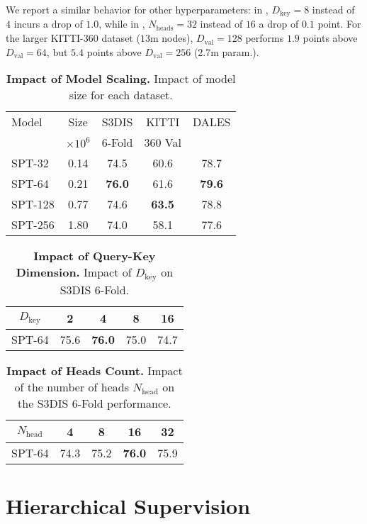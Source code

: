 We report a similar behavior for other hyperparameters: in , $D_\text{key}=8$ instead of $4$ incurs a drop of $1.0$, while in , $N_\text{heads}=32$ instead of $16$ a drop of $0.1$ point. For the larger KITTI-360 dataset ($13$m nodes), $D_\text{val}={128}$ performs $1.9$ points above $D_\text{val}=64$, but $5.4$ points above $D_\text{val}=256$ (2.7m param.).

\begin{table}[H]
\caption{\textbf{Impact of Model Scaling.} Impact of model size for each dataset.}
\label{tab:scalingablation}
\centering
\small{
\begin{tabular}{@{}lcccc@{}}
    \toprule
    Model & Size & S3DIS & KITTI & DALES \\
     & $\times10^6$ & 6-Fold & 360 Val & \\
    \midrule
    SPT-32  & 0.14 & 74.5 & 60.6 & 78.7 \\
    SPT-64  & 0.21 & \bf 76.0 & 61.6 & \bf 79.6 \\
    SPT-128 & 0.77 & 74.6 & \bf 63.5 & 78.8 \\
    SPT-256 & 1.80 & 74.0 & 58.1 & 77.6 \\
    \bottomrule
\end{tabular}}
\end{table} \begin{table}[H]
\caption{\textbf{Impact of Query-Key Dimension.} Impact of $D_\text{key}$ on S3DIS 6-Fold.}
\label{tab:qkdimablation}
\centering
\small{
\begin{tabular}{@{}ccccc@{}}
    \toprule
    $D_\text{key}$  & 2 & 4 & 8 & 16 \\
    \midrule
    SPT-64 & 75.6 & \bf 76.0 & 75.0 & 74.7 \\
    \bottomrule
\end{tabular}}
\end{table} \begin{table}[H]
\caption{\textbf{Impact of Heads Count.} Impact of the number of heads $N_\text{head}$ on the S3DIS 6-Fold performance.}
\label{tab:headsablation}
\centering
\small{
\begin{tabular}{@{}ccccc@{}}
    \toprule
    $N_\text{head}$ & 4 & 8 & 16 & 32 \\
    \midrule
   SPT-64 &  74.3 & 75.2 & \bf 76.0 & 75.9 \\
    \bottomrule
\end{tabular}}
\end{table} 
\section{Hierarchical Supervision}
\label{sec:lossablation}

